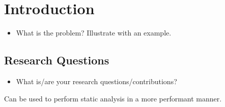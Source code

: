 \section{Introduction}
\begin{itemize}
    \item What is the problem? Illustrate with an example.
\end{itemize}


\subsection{Research Questions}
\begin{itemize}
    \item What is/are your research questions/contributions?
\end{itemize}


Can be used to perform static analysis in a more performant manner.